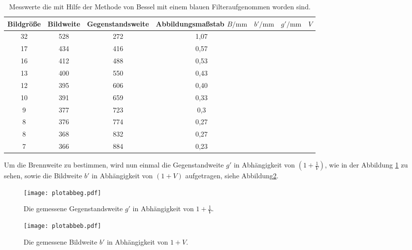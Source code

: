 \begin{table}
    \centering
    \caption{Messwerte die mit Hilfe der Methode von Bessel mit einem blauen Filteraufgenommen worden sind.}
    \label{tab:abbe}
    \begin{tabular}{c c c c c c c}
    \toprule
    Bildgröße  & Bildweite &Gegenstandsweite & Abbildungsmaßstab
     $B/\si{\milli\meter}$ &$b'/\si{\milli\meter}$ & $g'/\si{\milli\meter}$ &$V$\\
    \midrule
    32  &  528  &  272  & 1,07\\
    17  &  434  &  416  & 0,57\\
    16  &  412  &  488  & 0,53\\
    13  &  400  &  550  & 0,43\\
    12  &  395  &  606  & 0,40\\
    10  &  391  &  659  & 0,33\\
    9   &  377  &  723  & 0,3\\
    8   &  376  &  774  & 0,27\\
    8   &  368  &  832  & 0,27\\
    7   &  366  &  884  & 0,23\\
    \bottomrule
  \end{tabular}
\end{table}
\FloatBarrier
Um die Brennweite zu bestimmen, wird nun einmal
die Gegenstandweite $g'$ in Abhängigkeit von
  $(1+ \frac{1}{V})$, wie in der  Abbildung \ref{fig:Plotg'} zu sehen,
sowie die Bildweite $b'$ in Abhängigkeit von
$(1+V)$ aufgetragen, siehe Abbildung\ref{fig:Plotb'}.


\begin{figure}
  \centering
  \texttt{[image: plotabbeg.pdf]}
  \caption{Die gemessene Gegenstandsweite $g'$ in Abhängigkeit von $1+\frac{1}{V}$.}
  \label{fig:Plotg'}
\end{figure}

\begin{figure}
 \centering
 \texttt{[image: plotabbeb.pdf]}
 \caption{Die gemessene Bildweite $b'$ in Abhängigkeit von $1+V$.}
 \label{fig:Plotb'}
\end{figure}
\FloatBarrier

